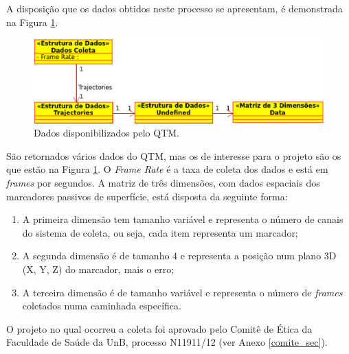 A disposição que os dados obtidos neste processo se apresentam, é demonstrada na Figura \ref{dados_coleta}.

\begin{figure}[ht]
	\centering
	\includegraphics[width=15cm]{figuras/dados_coleta.eps}
	\caption{Dados disponibilizados pelo QTM.}
	\label{dados_coleta}
\end{figure}

São retornados vários dados do QTM, mas os de interesse para o projeto são os que estão na Figura \ref{dados_coleta}. 
O \emph{Frame Rate} é a taxa de coleta dos dados e está em \emph{frames} por segundos. 
A matriz de três dimensões, com dados espaciais dos marcadores passivos de superfície, está disposta da seguinte forma:
\begin{enumerate}
	\item A primeira dimensão tem tamanho variável e representa o número de canais do sistema de coleta, ou seja, cada item representa um marcador;
	\item A segunda dimensão é de tamanho 4 e representa a posição num plano 3D (X, Y, Z) do marcador, mais o erro;
	\item A terceira dimensão é de tamanho variável e representa o número de \emph{frames} coletados numa caminhada específica.
\end{enumerate}

O projeto no qual ocorreu a coleta foi aprovado
pelo Comitê de Ética da Faculdade de Saúde da UnB,
processo N11911/12 (ver Anexo \ref{comite_sec}).
